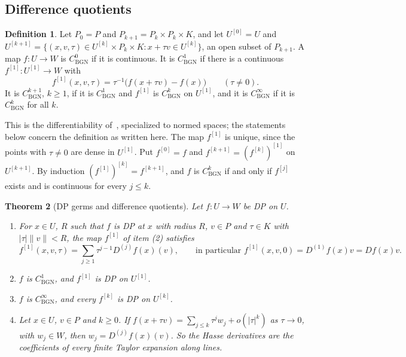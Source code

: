 \documentclass[11pt]{amsart}
\newtheorem{theorem}{Theorem}[section]
\theoremstyle{definition}
\newtheorem{definition}[theorem]{Definition}
\theoremstyle{remark}
\numberwithin{equation}{section}
\newcommand{\abs}[1]{\lvert #1\rvert}
\newcommand{\norm}[1]{\lVert #1\rVert}
\theoremstyle{plain}
\theoremstyle{definition}
\theoremstyle{plain}
\begin{document}
\subsection{Difference quotients}\label{dp:sq:ssec-quotients}

\begin{definition}\label{dp:def:bgn}
Let $P_0=P$ and $P_{k+1}=P_k\times P_k\times K$, and let $U^{[0]}=U$ and $U^{[k+1]}=\{(x,v,\tau)\in U^{[k]}\times P_k\times K:x+\tau v\in U^{[k]}\}$, an open subset of $P_{k+1}$. A map $f\colon U\to W$ is \emph{$C^0_{\mathrm{BGN}}$} if it is continuous. It is \emph{$C^1_{\mathrm{BGN}}$} if there is a continuous $f^{[1]}\colon U^{[1]}\to W$ with
\[
 f^{[1]}(x,v,\tau)=\tau^{-1}\bigl(f(x+\tau v)-f(x)\bigr)\qquad(\tau\ne0).
\]
It is \emph{$C^{k+1}_{\mathrm{BGN}}$}, $k\ge1$, if it is $C^1_{\mathrm{BGN}}$ and $f^{[1]}$ is $C^k_{\mathrm{BGN}}$ on $U^{[1]}$, and it is \emph{$C^\infty_{\mathrm{BGN}}$} if it is $C^k_{\mathrm{BGN}}$ for all $k$.
\end{definition}

This is the differentiability of~\cite{BGN}, specialized to normed spaces; the statements below concern the definition as written here. The map $f^{[1]}$ is unique, since the points with $\tau\ne0$ are dense in $U^{[1]}$. Put $f^{[0]}=f$ and $f^{[k+1]}=(f^{[k]})^{[1]}$ on $U^{[k+1]}$. By induction $(f^{[1]})^{[k]}=f^{[k+1]}$, and $f$ is $C^k_{\mathrm{BGN}}$ if and only if $f^{[j]}$ exists and is continuous for every $j\le k$.

\begin{theorem}[DP germs and difference quotients]\label{dp:thm:bgn}
Let $f\colon U\to W$ be DP on $U$.
\begin{enumerate}
\item For $x\in U$, $R$ such that $f$ is DP at $x$ with radius $R$, $v\in P$ and $\tau\in K$ with $\abs\tau\norm v<R$, the map $f^{[1]}$ of item \textup{(2)} satisfies
\begin{equation}\label{dp:sq:quotient-series}
 f^{[1]}(x,v,\tau)=\sum_{j\ge1}\tau^{j-1}D^{(j)}f(x)(v),\qquad\text{in particular } f^{[1]}(x,v,0)=D^{(1)}f(x)v=Df(x)v.
\end{equation}
\item $f$ is $C^1_{\mathrm{BGN}}$, and $f^{[1]}$ is DP on $U^{[1]}$.
\item $f$ is $C^\infty_{\mathrm{BGN}}$, and every $f^{[k]}$ is DP on $U^{[k]}$.
\item Let $x\in U$, $v\in P$ and $k\ge0$. If $f(x+\tau v)=\sum_{j\le k}\tau^jw_j+o(\abs\tau^k)$ as $\tau\to0$, with $w_j\in W$, then $w_j=D^{(j)}f(x)(v)$. So the Hasse derivatives are the coefficients of every finite Taylor expansion along lines.
\end{enumerate}
\end{theorem}
\end{document}
